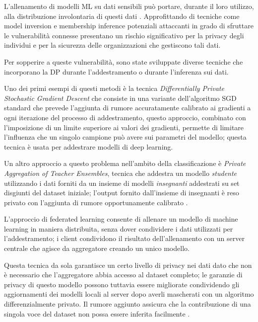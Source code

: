 L'allenamento di modelli ML su dati sensibili può portare, durante il loro utilizzo, alla distribuzione involontaria di questi dati \cite{Zhang_2023mlprivacy}. Approfittando di tecniche come model inversion \cite{OWASPmlinversion:online} e membership inference \cite{OWASPmembinference:online} potenziali attaccanti in grado di sfruttare le vulnerabilità connesse presentano un rischio significativo per la privacy degli individui e per la sicurezza delle organizzazioni che gestiscono tali dati.


Per sopperire a queste vulnerabilità, sono state sviluppate diverse tecniche che incorporano la DP durante l'addestramento o durante l'inferenza sui dati.

Uno dei primi esempi di questi metodi è la tecnica \textit{Differentially Private Stochastic Gradient Descent} \cite{Abadi_2016dpsgd} che consiste in una variante dell'algoritmo SGD standard che prevede l'aggiunta di rumore accuratamente calibrato ai gradienti a ogni iterazione del processo di addestramento, questo approccio, combinato con l'imposizione di un limite superiore ai valori dei gradienti, permette di limitare l'influenza che un singolo campione può avere sui parametri del modello; questa tecnica è usata per addestrare modelli di deep learning.

Un altro approccio a questo problema nell'ambito della classificazione è \textit{Private Aggregation of Teacher Ensembles}, tecnica che addestra un modello \textit{studente} utilizzando i dati forniti da un insieme di modelli \textit{insegnanti} addestrati su set disgiunti del dataset iniziale; l'output fornito dall'insieme di insegnanti è reso privato con l'aggiunta di rumore opportunamente calibrato \cite{papernot2018scalableprivatelearningpate}.

L'approccio di federated learning consente di allenare un modello di machine learning in maniera distribuita, senza dover condividere i dati utilizzati per l'addestramento; i client condividono il risultato dell'allenamento con un server centrale che agisce da aggregatore creando un unico modello.

Questa tecnica da sola garantisce un certo livello di privacy nei dati dato che non è necessario che l'aggregatore abbia accesso al dataset completo; le garanzie di privacy di questo modello possono tuttavia essere migliorate condividendo gli aggiornamenti dei modelli locali al server dopo averli mascherati con un algoritmo differenzialmente privato. Il rumore aggiunto assicura che la contribuzione di una singola voce del dataset non possa essere inferita facilmente \cite{peterson2019privatefederatedlearningdomain}.

